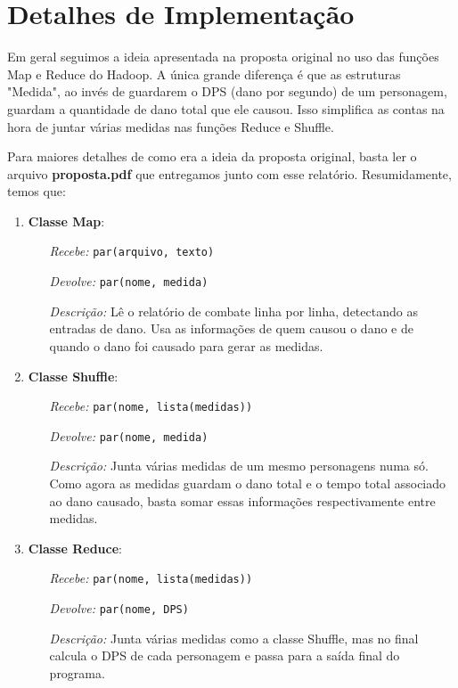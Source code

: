 \documentclass[a4paper,11pt]{article}
\begin{document}
\section{Detalhes de Implementação}

  Em geral seguimos a ideia apresentada na proposta original no uso das funções
  Map e Reduce do Hadoop. A única grande diferença é que as estruturas "Medida",
  ao invés de guardarem o DPS (dano por segundo) de um personagem, guardam a
  quantidade de dano total que ele causou. Isso simplifica as contas na hora de
  juntar várias medidas nas funções Reduce e Shuffle.
  
  Para maiores detalhes de como era a ideia da proposta original, basta ler o
  arquivo \textbf{proposta.pdf} que entregamos junto com esse relatório.
  Resumidamente, temos que:
  
  \begin{enumerate}
    \item
      \textbf{Classe Map}:
      \begin{itemize}
        \item[\textit{Recebe:}] \verb$par(arquivo, texto)$
        \item[\textit{Devolve:}] \verb$par(nome, medida)$
        \item[\textit{Descrição:}]
          Lê o relatório de combate linha por linha, detectando as entradas de
          dano. Usa as informações de quem causou o dano e de quando o dano foi
          causado para gerar as medidas.
      \end{itemize}
    \item
      \textbf{Classe Shuffle}:
      \begin{itemize}
        \item[\textit{Recebe:}] \verb$par(nome, lista(medidas))$
        \item[\textit{Devolve:}] \verb$par(nome, medida)$
        \item[\textit{Descrição:}]
          Junta várias medidas de um mesmo personagens numa só. Como agora as
          medidas guardam o dano total e o tempo total associado ao dano
          causado, basta somar essas informações respectivamente entre medidas.
      \end{itemize}
    \item
      \textbf{Classe Reduce}:
      \begin{itemize}
        \item[\textit{Recebe:}] \verb$par(nome, lista(medidas))$
        \item[\textit{Devolve:}] \verb$par(nome, DPS)$
        \item[\textit{Descrição:}]
          Junta várias medidas como a classe Shuffle, mas no final calcula o
          DPS de cada personagem e passa para a saída final do programa.
      \end{itemize}
  \end{enumerate}
  
\end{document}
